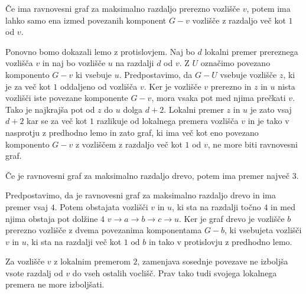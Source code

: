 \documentclass[fin1, tisk]{fmfdelo}
\begin{document}
\begin{lema}
Če ima ravnovesni graf za maksimalno razdaljo prerezno vozlišče $v$, potem ima lahko
samo ena izmed povezanih komponent $G - v$ vozlišče z razdaljo več kot $1$ od $v$.
\end{lema}

\begin{dokaz}
Ponovno bomo dokazali lemo z protislovjem. Naj bo $d$ lokalni premer prereznega vozlišča $v$
in naj bo vozlišče $u$ na razdalji $d$ od $v$. Z $U$ označimo povezano komponento $G - v$ ki vsebuje $u$.
Predpostavimo, da $G - U$ vsebuje vozlišče $z$, ki je za več kot $1$ oddaljeno od vozlišča $v$. Ker je vozlišče $v$
prerezno in $z$ in $u$ nista vozlišči iste povezane komponente $G - v$, mora vsaka pot med njima prečkati $v$.
Tako je najkrajša pot od $z$ do $u$ dolga $d + 2$. Lokalni premer $z$ in $u$ je zato vsaj $d + 2$
kar se za več kot $1$ razlikuje od lokalnega premera vozlišča $v$ in je tako v nasprotju z predhodno lemo
in zato graf, ki ima več kot eno povezano komponento $G - v$ z vozliščem z razdaljo več kot $1$ od $v$,
ne more biti ravnovesni graf.
\end{dokaz}

\begin{izrek}
Če je ravnovesni graf za maksimalno razdaljo drevo, potem ima premer največ $3$.
\end{izrek}


\begin{dokaz}
Predpostavimo, da je ravnovesni graf za maksimalno razdaljo drevo in ima premer vsaj $4$.
Potem obstajata vozlišči $v$ in $u$, ki sta na razdalji točno $4$ in med njima obstaja pot dolžine $4$
$v \to a \to b \to c \to u$. Ker je graf drevo je vozlišče $b$ prerezno vozlišče z dvema
povezanima komponentama $G - b$, ki vsebujeta vozlišči $v$ in $u$, ki sta na razdalji več kot $1$ od $b$
in tako v protislovju z predhodno lemo.
\end{dokaz}


\begin{lema}
Za vozlišče $v$ z lokalnim premerom $2$, zamenjava sosednje povezave ne izboljša
vsote razdalj od $v$ do vseh ostalih voclišč. Prav tako tudi svojega lokalnega premera ne more izboljšati.
\end{lema}
\end{document}
